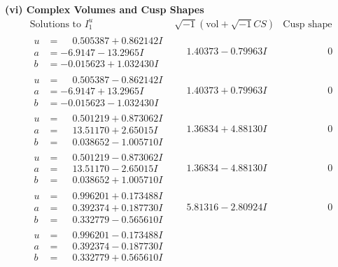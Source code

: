 \documentclass[1p]{elsarticle_modified}
\theoremstyle{definition}
\newcommand{\I}{\sqrt{-1}}
\begin{document}
\newpage\flushleft \textbf{(vi) Complex Volumes and Cusp Shapes}
$$\begin{array}{c|c|c}  
\text{Solutions to }I^u_{1}& \I (\text{vol} + \sqrt{-1}CS) & \text{Cusp shape}\\
 \hline 
\begin{aligned}
u &= \phantom{-}0.505387 + 0.862142 I \\
a &= -6.9147 - 13.2965 I \\
b &= -0.015623 + 1.032430 I\end{aligned}
 & \phantom{-}1.40373 - 0.79963 I & \phantom{-0.000000 } 0 \\ \hline\begin{aligned}
u &= \phantom{-}0.505387 - 0.862142 I \\
a &= -6.9147 + 13.2965 I \\
b &= -0.015623 - 1.032430 I\end{aligned}
 & \phantom{-}1.40373 + 0.79963 I & \phantom{-0.000000 } 0 \\ \hline\begin{aligned}
u &= \phantom{-}0.501219 + 0.873062 I \\
a &= \phantom{-}13.51170 + 2.65015 I \\
b &= \phantom{-}0.038652 - 1.005710 I\end{aligned}
 & \phantom{-}1.36834 + 4.88130 I & \phantom{-0.000000 } 0 \\ \hline\begin{aligned}
u &= \phantom{-}0.501219 - 0.873062 I \\
a &= \phantom{-}13.51170 - 2.65015 I \\
b &= \phantom{-}0.038652 + 1.005710 I\end{aligned}
 & \phantom{-}1.36834 - 4.88130 I & \phantom{-0.000000 } 0 \\ \hline\begin{aligned}
u &= \phantom{-}0.996201 + 0.173488 I \\
a &= \phantom{-}0.392374 + 0.187730 I \\
b &= \phantom{-}0.332779 - 0.565610 I\end{aligned}
 & \phantom{-}5.81316 - 2.80924 I & \phantom{-0.000000 } 0 \\ \hline\begin{aligned}
u &= \phantom{-}0.996201 - 0.173488 I \\
a &= \phantom{-}0.392374 - 0.187730 I \\
b &= \phantom{-}0.332779 + 0.565610 I\end{aligned}

\end{array}$$
\end{document}
